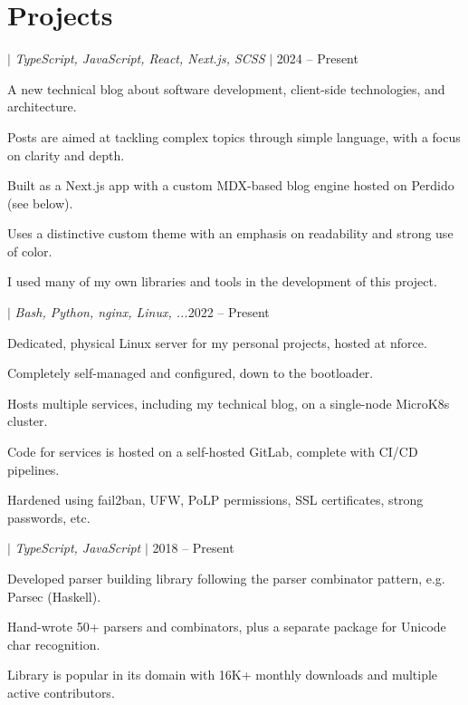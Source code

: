 \documentclass[a4paper,11pt]{article}
\begin{document}
\section{Projects}
\begin{sectionList}%
    \begin{project}{\textbf{\gregrosdev} $|$ \emph{TypeScript, JavaScript, React, Next.js, SCSS} $|$ \https{\mywebsite}}{2024 -- Present}
        \item A new technical blog about software development, client-side technologies, and architecture.
        \item Posts are aimed at tackling complex topics through simple language, with a focus on clarity and depth.
        \item Built as a Next.js app with a custom MDX-based blog engine hosted on Perdido (see below).
        \item Uses a distinctive custom theme with an emphasis on readability and strong use of color.
        \item I used many of my own libraries and tools in the development of this project.
    \end{project}
    \begin{project}{\textbf{\perdido} $|$ \emph{Bash, Python, nginx, Linux, ...}}{2022 -- Present}
        \item Dedicated, physical Linux server for my personal projects, hosted at nforce.
        \item Completely self-managed and configured, down to the bootloader.
        \item Hosts multiple services, including my technical blog, on a single-node MicroK8s cluster.
        \item Code for services is hosted on a self-hosted GitLab, complete with CI/CD pipelines.
        \item Hardened using fail2ban, UFW, PoLP permissions, SSL certificates, strong passwords, etc.
    \end{project}
    \begin{project}{\textbf{\parjs} $|$ \emph{TypeScript, JavaScript} $|$ }{2018 -- Present}
        \item Developed parser building library following the parser combinator pattern, e.g. Parsec (Haskell).
        \item Hand-wrote 50+ parsers and combinators, plus a separate package for Unicode char recognition.
        \item Library is popular in its domain with 16K+ monthly downloads and multiple active contributors.

\end{project}
\end{sectionList}
\end{document}
